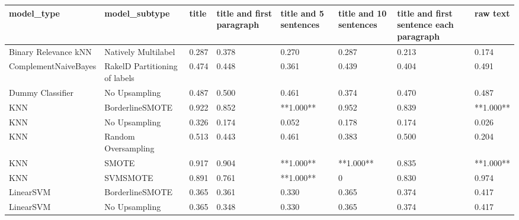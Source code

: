 \begin{tabular}{llllllll}
\toprule
                     model\_type &                 model\_subtype & title & title and first paragraph & title and 5 sentences & title and 10 sentences & title and first sentence each paragraph &  raw text \\
\midrule
           Binary Relevance kNN &           Natively Multilabel & 0.287 &                     0.378 &                 0.270 &                  0.287 &                                   0.213 &     0.174 \\
           ComplementNaiveBayes & RakelD Partitioning of labels & 0.474 &                     0.448 &                 0.361 &                  0.439 &                                   0.404 &     0.491 \\
               Dummy Classifier &                 No Upsampling & 0.487 &                     0.500 &                 0.461 &                  0.374 &                                   0.470 &     0.487 \\
                            KNN &               BorderlineSMOTE & 0.922 &                     0.852 &             **1.000** &                  0.952 &                                   0.839 & **1.000** \\
                            KNN &                 No Upsampling & 0.326 &                     0.174 &                 0.052 &                  0.178 &                                   0.174 &     0.026 \\
                            KNN &           Random Oversampling & 0.513 &                     0.443 &                 0.461 &                  0.383 &                                   0.500 &     0.204 \\
                            KNN &                         SMOTE & 0.917 &                     0.904 &             **1.000** &              **1.000** &                                   0.835 & **1.000** \\
                            KNN &                      SVMSMOTE & 0.891 &                     0.761 &             **1.000** &                      0 &                                   0.830 &     0.974 \\
                      LinearSVM &               BorderlineSMOTE & 0.365 &                     0.361 &                 0.330 &                  0.365 &                                   0.374 &     0.417 \\
                      LinearSVM &                 No Upsampling & 0.365 &                     0.348 &                 0.330 &                  0.365 &                                   0.374 &     0.417 \\

\end{tabular}
